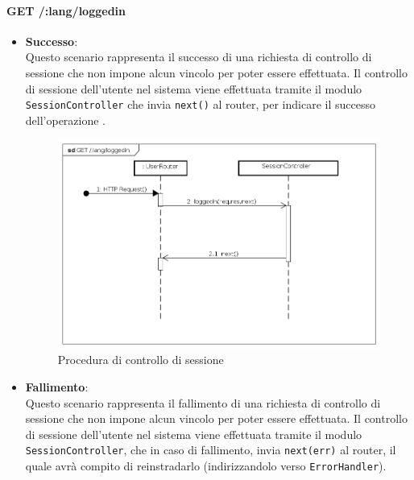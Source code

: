 \paragraph{GET /:lang/loggedin}
\begin{itemize}
\item \textbf{Successo}:\\
Questo scenario rappresenta il successo di una richiesta di controllo di sessione che non impone alcun vincolo per poter essere effettuata. Il controllo di sessione dell'utente nel sistema viene effettuata tramite il modulo \texttt{SessionController} che invia \texttt{next()} al router, per indicare il successo dell'operazione .

\label{Procedura di controllo di sessione}
\begin{figure}[ht]
	\centering
	\includegraphics[scale=0.40]{UML/DiagrammiDiSequenza/Back-end/GET__lang_loggedin_success.png}
	\caption{Procedura di controllo di sessione}
\end{figure}
\FloatBarrier
 
\item \textbf{Fallimento}:\\
Questo scenario rappresenta il fallimento di una richiesta di controllo di sessione che non impone alcun vincolo per poter essere effettuata. Il controllo di sessione dell'utente nel sistema viene effettuata tramite il modulo \texttt{SessionController}, che in caso di fallimento, invia \texttt{next(err)} al router,  il quale avrà compito di reinstradarlo (indirizzandolo verso \texttt{ErrorHandler}).


\end{itemize}
